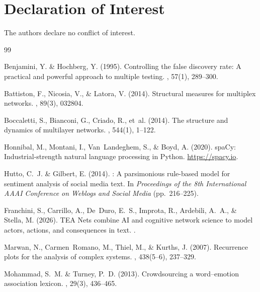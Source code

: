 \documentclass[11pt,a4paper]{article}
\begin{document}
\section*{Declaration of Interest}

The authors declare no conflict of interest.




\begin{thebibliography}{99}

Benjamini, Y. \& Hochberg, Y. (1995).
\newblock Controlling the false discovery rate: A practical and powerful approach to multiple testing.
, 57(1), 289--300.

Battiston, F., Nicosia, V., \& Latora, V. (2014).
\newblock Structural measures for multiplex networks.
, 89(3), 032804.

Boccaletti, S., Bianconi, G., Criado, R., et~al. (2014).
\newblock The structure and dynamics of multilayer networks.
, 544(1), 1--122.

Honnibal, M., Montani, I., Van~Landeghem, S., \& Boyd, A. (2020).
\newblock spaCy: Industrial-strength natural language processing in {Python}.
\newblock \url{https://spacy.io}.

Hutto, C.~J. \& Gilbert, E. (2014).
: A parsimonious rule-based model for sentiment analysis of social media text.
\newblock In {\em Proceedings of the 8th International AAAI Conference on Weblogs and Social Media} (pp.~216--225).

Franchini, S., Carrillo, A., De~Duro, E.~S., Improta, R., Ardebili, A.~A., \& Stella, M. (2026).
\newblock TEA Nets combine AI and cognitive network science to model actors, actions, and consequences in text.
.

Marwan, N., Carmen~Romano, M., Thiel, M., \& Kurths, J. (2007).
\newblock Recurrence plots for the analysis of complex systems.
, 438(5--6), 237--329.

Mohammad, S.~M. \& Turney, P.~D. (2013).
\newblock Crowdsourcing a word--emotion association lexicon.
, 29(3), 436--465.


\end{thebibliography}
\end{document}
